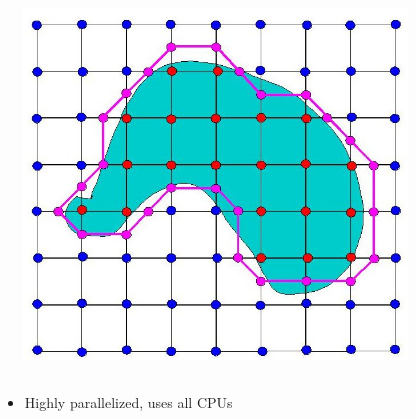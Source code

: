 \documentclass{beamer}
\begin{document}
\begin{frame}
\begin{columns}
\begin{column}{0.33\textwidth}
  \end{column}
  \begin{column}{0.33\textwidth}
    \includegraphics[width=0.8\textwidth, left]{connectedobj.jpg}
  \end{column}
\end{columns}
\begin{itemize}
\item Highly parallelized, uses all CPUs
\end{itemize}
\end{frame}
\end{document}
